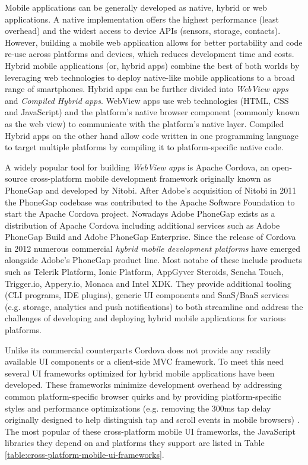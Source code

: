 \documentclass[thesis.tex]{subfiles}
\begin{document}
Mobile applications can be generally developed as native, hybrid or web applications. A native implementation offers the highest performance (least overhead) and the widest access to device APIs (sensors, storage, contacts). However, building a mobile web application allows for better portability and code re-use across platforms and devices, which reduces development time and costs. Hybrid mobile applications (or, hybrid apps) combine the best of both worlds by leveraging web technologies to deploy native-like mobile applications to a broad range of smartphones. Hybrid apps can be further divided into \textit{WebView apps} and \textit{Compiled Hybrid apps}. WebView apps use web technologies (HTML, CSS and JavaScript) and the platform's native browser component (commonly known as the web view) to communicate with the platform's native layer. Compiled Hybrid apps on the other hand allow code written in one programming language to target multiple platforms by compiling it to platform-specific native code.

A widely popular tool for building \textit{WebView apps} is Apache Cordova, an open-source cross-platform mobile development framework originally known as PhoneGap and developed by Nitobi. After Adobe's acquisition of Nitobi in 2011 the PhoneGap codebase was contributed to the Apache Software Foundation to start the Apache Cordova project. Nowadays Adobe PhoneGap exists as a distribution of Apache Cordova including additional services such as Adobe PhoneGap Build and Adobe PhoneGap Enterprise. Since the release of Cordova in 2012 numerous commercial \textit{hybrid mobile development platforms} have emerged alongside Adobe's PhoneGap product line. Most notabe of these include products such as Telerik Platform, Ionic Platform, AppGyver Steroids, Sencha Touch, Trigger.io, Appery.io, Monaca and Intel XDK. They provide additional tooling (CLI programs, IDE plugins), generic UI components and SaaS/BaaS services (e.g. storage, analytics and push notifications) to both streamline and address the challenges of developing and deploying hybrid mobile applications for various platforms.

Unlike its commercial counterparts Cordova does not provide any readily available UI components or a client-side MVC framework. To meet this need several UI frameworks optimized for hybrid mobile applications have been developed. These frameworks minimize development overhead by addressing common platform-specific browser quirks and by providing platform-specific styles and performance optimizations (e.g. removing the 300ms tap delay originally designed to help distinguish tap and scroll events in mobile browsers) \cite{click_delay}. The most popular of these cross-platform mobile UI frameworks, the JavaScript libraries they depend on and platforms they support are listed in Table \ref{table:cross-platform-mobile-ui-frameworks}.
\end{document}
